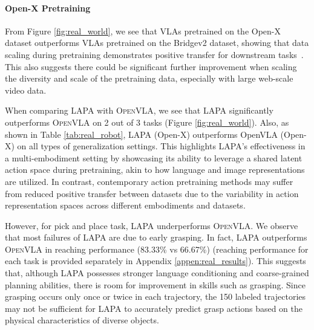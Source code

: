 \documentclass{article} %
\begin{document}
\paragraph{Open-X Pretraining} From Figure \ref{fig:real_world}, we see that VLAs pretrained on the Open-X dataset outperforms VLAs pretrained on the Bridgev2 dataset, showing that data scaling during pretraining demonstrates positive transfer for downstream tasks~\citep{open_x_embodiment_rt_x_2023}. This also suggests there could be significant further improvement when scaling the diversity and scale of the pretraining data, especially with large web-scale video data.

When comparing LAPA with \textsc{OpenVLA}, we see that LAPA significantly outperforms \textsc{OpenVLA} on 2 out of 3 tasks (Figure \ref{fig:real_world}). {Also, as shown in Table \ref{tab:real_robot}, LAPA (Open-X) outperforms OpenVLA (Open-X) on all types of generalization settings.} This highlights LAPA's effectiveness in a multi-embodiment setting by showcasing its ability to leverage a shared latent action space during pretraining, akin to how language and image representations are utilized. In contrast, contemporary action pretraining methods may suffer from reduced positive transfer between datasets due to the variability in action representation spaces across different embodiments and datasets.

However, for pick and place task, LAPA underperforms \textsc{OpenVLA}. We observe that most failures of LAPA are due to early grasping. In fact, LAPA outperforms \textsc{OpenVLA} in reaching performance (83.33\% vs 66.67\%) (reaching performance for each task is provided separately in Appendix \ref{appen:real_results}). This suggests that, although LAPA possesses stronger language conditioning and coarse-grained planning abilities, there is room for improvement in skills such as grasping. Since grasping occurs only once or twice in each trajectory, the 150 labeled trajectories may not be sufficient for LAPA to accurately predict grasp actions based on the physical characteristics of diverse objects. 
\end{document}
